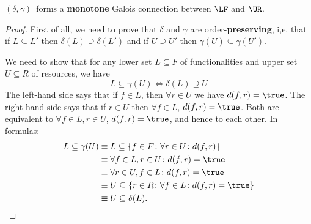 \begin{lemma} $(\delta, \gamma)$~forms a \textbf{monotone} Galois connection between $\LF$ and $\UR$.
\end{lemma}
\begin{proof}

First of all, we need to prove that $\delta$ and $\gamma$ are order-\textbf{preserving}, i,e. that if $L\subseteq L'$ then $\delta(L)\supseteq\delta(L')$ and if $U\supseteq U'$ then $\gamma(U)\subseteq\gamma(U')$. 

\noindent We need to show that for any lower set $L\subseteq F$ of functionalities and upper set $U\subseteq R$ of resources, we have
\begin{equation}
L\subseteq\gamma(U) \iff \delta(L)\supseteq U
\end{equation}
The left-hand side says that if $f\in L$, then $\forall r \in U$ we have $d(f,r)=\true$. The right-hand side says that if $r\in U$ then $\forall f \in L$, $d(f,r)=\true$. Both are equivalent to $\forall f\in L,r\in U$, $d(f,r)=\true$, and hence to each other. In formulas:
\begin{equation}
    \begin{aligned}
    L \subseteq \gamma(U)&\equiv L\subseteq \{f \in F\colon \forall r\in U\colon d(f,r)\} \\
    &\equiv \forall f\in L, r\in U \colon d(f,r)=\true \\
    &\equiv \forall r\in U, f\in L \colon d(f,r)=\true\\
    &\equiv U\subseteq \{r\in R\colon \forall f\in L\colon d(f,r)=\true \}\\
    &\equiv U\subseteq \delta(L).
    \end{aligned}
\end{equation}
\end{proof}
